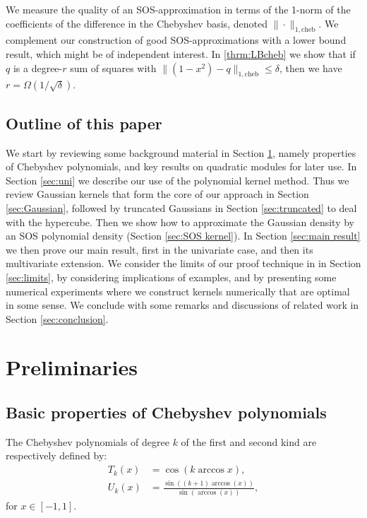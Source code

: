 \documentclass[11pt]{article}
\newcommand{\N}{\mathbb{N}}
\theoremstyle{definition}
\newcommand{\cheb}{{1,\mathrm{cheb}}}
\begin{document}
We measure the quality of an SOS-approximation in terms of the 1-norm of the coefficients of the difference in the Chebyshev basis, denoted $\|\cdot\|_\cheb$. We complement our construction of good SOS-approximations with a lower bound result, which might be of independent interest. In \cref{thrm:LBcheb} we show that if $q$ is a degree-$r$ sum of squares with $\|(1-x^2)-q\|_\cheb \leq \delta$, then we have $r = \Omega(1/\sqrt{\delta})$.


\subsection*{Outline of this paper}
We start by reviewing some background material in Section \ref{sec:preliminaries}, namely properties of Chebyshev polynomials,
and key results on quadratic modules for later use.
In Section \ref{sec:uni} we describe our use of the polynomial kernel method. Thus we review Gaussian kernels that form the core of our approach in Section \ref{sec:Gaussian}, followed by truncated Gaussians in Section \ref{sec:truncated} to deal with the hypercube.
Then we show how to approximate the Gaussian density by an SOS polynomial density (Section \ref{sec:SOS kernel}). In Section \ref{sec:main result} we then prove our main result, first in the univariate case, and then its multivariate extension.
We consider the limits of our proof technique in in Section \ref{sec:limits}, by considering implications of examples, and
by presenting some numerical experiments where we construct kernels numerically that are optimal in some sense. We conclude with some remarks and discussions of related work in Section \ref{sec:conclusion}.


\section{Preliminaries}
\label{sec:preliminaries}


\subsection{Basic properties of Chebyshev polynomials}
The Chebyshev polynomials of degree $k$ of the first and second kind are respectively defined by:
	\begin{align}
	T_{k}(x) & = \cos (k \arccos x ), \\
	U_k(x) &= \frac{\sin((k+1)\arccos(x))}{\sin(\arccos(x))},
	\end{align}
	for $x \in [-1,1]$.
	
\end{document}
